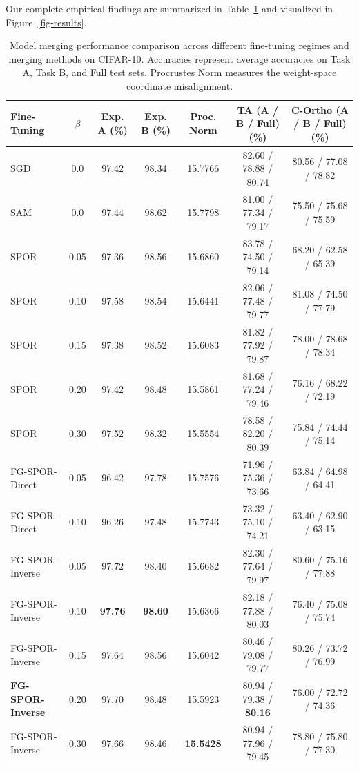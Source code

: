\documentclass{article}
\theoremstyle{plain}
\theoremstyle{definition}
\theoremstyle{remark}
\begin{document}
Our complete empirical findings are summarized in Table~\ref{table-results} and visualized in Figure~\ref{fig-results}.

\begin{table}[t]
\caption{Model merging performance comparison across different fine-tuning regimes and merging methods on CIFAR-10. Accuracies represent average accuracies on Task A, Task B, and Full test sets. Procrustes Norm measures the weight-space coordinate misalignment.}
\label{table-results}
\vskip 0.15in
\begin{center}
\begin{footnotesize}
\begin{sc}
\setlength{\tabcolsep}{3.5pt}
\begin{tabular}{lcccccc}
\toprule
Fine-Tuning & $\beta$ & Exp. A (\%) & Exp. B (\%) & Proc. Norm & TA (A / B / Full) (\%) & C-Ortho (A / B / Full) (\%) \\
\midrule
SGD & 0.0 & 97.42 & 98.34 & 15.7766 & 82.60 / 78.88 / 80.74 & 80.56 / 77.08 / 78.82 \\
SAM & 0.0 & 97.44 & 98.62 & 15.7798 & 81.00 / 77.34 / 79.17 & 75.50 / 75.68 / 75.59 \\
\midrule
SPOR & 0.05 & 97.36 & 98.56 & 15.6860 & 83.78 / 74.50 / 79.14 & 68.20 / 62.58 / 65.39 \\
SPOR & 0.10 & 97.58 & 98.54 & 15.6441 & 82.06 / 77.48 / 79.77 & 81.08 / 74.50 / 77.79 \\
SPOR & 0.15 & 97.38 & 98.52 & 15.6083 & 81.82 / 77.92 / 79.87 & 78.00 / 78.68 / 78.34 \\
SPOR & 0.20 & 97.42 & 98.48 & 15.5861 & 81.68 / 77.24 / 79.46 & 76.16 / 68.22 / 72.19 \\
SPOR & 0.30 & 97.52 & 98.32 & 15.5554 & 78.58 / 82.20 / 80.39 & 75.84 / 74.44 / 75.14 \\
\midrule
FG-SPOR-Direct & 0.05 & 96.42 & 97.78 & 15.7576 & 71.96 / 75.36 / 73.66 & 63.84 / 64.98 / 64.41 \\
FG-SPOR-Direct & 0.10 & 96.26 & 97.48 & 15.7743 & 73.32 / 75.10 / 74.21 & 63.40 / 62.90 / 63.15 \\
\midrule
FG-SPOR-Inverse & 0.05 & 97.72 & 98.40 & 15.6682 & 82.30 / 77.64 / 79.97 & 80.60 / 75.16 / 77.88 \\
FG-SPOR-Inverse & 0.10 & \textbf{97.76} & \textbf{98.60} & 15.6366 & 82.18 / 77.88 / 80.03 & 76.40 / 75.08 / 75.74 \\
FG-SPOR-Inverse & 0.15 & 97.64 & 98.56 & 15.6042 & 80.46 / 79.08 / 79.77 & 80.26 / 73.72 / 76.99 \\
\textbf{FG-SPOR-Inverse} & 0.20 & 97.70 & 98.48 & 15.5923 & 80.94 / 79.38 / \textbf{80.16} & 76.00 / 72.72 / 74.36 \\
FG-SPOR-Inverse & 0.30 & 97.66 & 98.46 & \textbf{15.5428} & 80.94 / 77.96 / 79.45 & 78.80 / 75.80 / 77.30 \\
\bottomrule
\end{tabular}
\end{sc}
\end{footnotesize}
\end{center}
\vskip -0.1in
\end{table}
\end{document}
